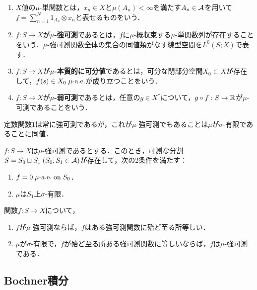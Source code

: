\documentclass[uplatex,dvipdfmx]{jsreport}
\begin{document}
\begin{definition}\mbox{}
    \begin{enumerate}
        \item $X$値の$\mu$-単関数とは，$x_n\in X$と$\mu(A_n)<\infty$を満たす$A_n\in\mathcal{A}$を用いて$f=\sum_{n=1}^N1_{A_n}\otimes x_n$と表せるものをいう．
        \item $f:S\to X$が\textbf{$\mu$-強可測}であるとは，$f$に$\mu$-概収束する$\mu$-単関数列が存在することをいう．$\mu$-強可測関数全体の集合の同値類がなす線型空間を$L^0(S;X)$で表す．
        \item $f:S\to X$が\textbf{$\mu$-本質的に可分値}であるとは，可分な閉部分空間$X_0\subset X$が存在して，$f(s)\in X_0\;\mu\text{-a.e.}$が成り立つことをいう．
        \item $f:S\to X$が\textbf{$\mu$-弱可測}であるとは，任意の$g\in X^*$について，$g\circ f:S\to\mathbb{R}$が$\mu$-可測であることをいう．
    \end{enumerate}
\end{definition}

\begin{example}
    定数関数$1$は常に強可測であるが，これが$\mu$-強可測でもあることは$\mu$が$\sigma$-有限であることに同値．
\end{example}

\begin{proposition}
    $f:S\to X$は$\mu$-強可測であるとする．このとき，可測な分割$S=S_0\sqcup S_1\;(S_0,S_1\in\mathcal{A})$が存在して，次の2条件を満たす：
    \begin{enumerate}
        \item $f=0\;\mu\text{-a.e.}\;\mathrm{on}\; S_0$．
        \item $\mu$は$S_1$上$\sigma$-有限．
    \end{enumerate}
\end{proposition}

\begin{proposition}[$\mu$-強可測性と一般の強可測性]
    関数$f:S\to X$について，
    \begin{enumerate}
        \item $f$が$\mu$-強可測ならば，$f$はある強可測関数に殆ど至る所等しい．
        \item $\mu$が$\sigma$-有限で，$f$が殆ど至る所ある強可測関数に等しいならば，$f$は$\mu$-強可測である．
    \end{enumerate}
\end{proposition}

\subsection{Bochner積分}
\end{document}
